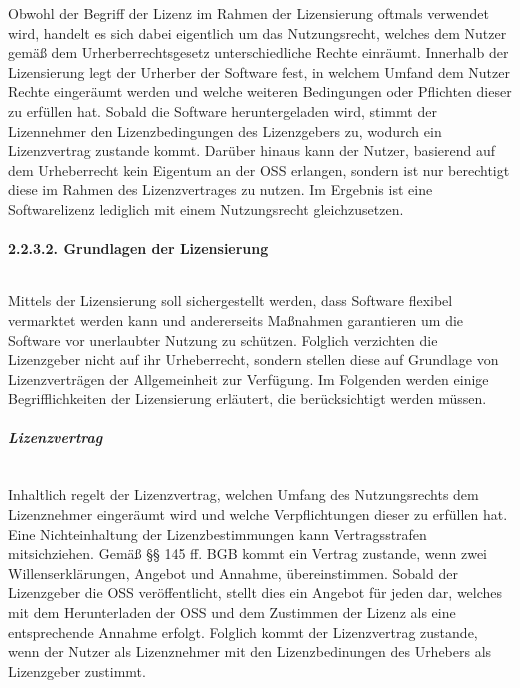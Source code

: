 Obwohl der Begriff der Lizenz im Rahmen der Lizensierung oftmals verwendet wird, handelt es sich dabei eigentlich um das Nutzungsrecht, welches dem Nutzer gemäß dem Urherberrechtsgesetz unterschiedliche Rechte einräumt.\cite[S. 25]{groll_1x1_2021} \cite{wilmer_rechtliche_2021} Innerhalb der Lizensierung legt der Urherber der Software fest, in welchem Umfand dem Nutzer Rechte eingeräumt werden und welche weiteren Bedingungen oder Pflichten dieser zu erfüllen hat. Sobald die Software heruntergeladen wird, stimmt der Lizennehmer den Lizenzbedingungen des Lizenzgebers zu, wodurch ein Lizenzvertrag zustande kommt. \cite{wilmer_rechtliche_2021} Darüber hinaus kann der Nutzer, basierend auf dem Urheberrecht kein Eigentum an der OSS erlangen, sondern ist nur berechtigt diese im Rahmen des Lizenzvertrages zu nutzen. Im Ergebnis ist eine Softwarelizenz lediglich mit einem Nutzungsrecht gleichzusetzen.\cite[S. 29]{kees_open_2015}

\paragraph{2.2.3.2. Grundlagen der Lizensierung}$~$

Mittels der Lizensierung soll sichergestellt werden, dass Software flexibel vermarktet werden kann und andererseits Maßnahmen garantieren um die Software vor unerlaubter Nutzung zu schützen. \cite[S. 29]{schaaf_open-source-lizenzen_2013} Folglich verzichten die Lizenzgeber nicht auf ihr Urheberrecht, sondern stellen diese auf Grundlage von Lizenzverträgen der Allgemeinheit zur Verfügung. Im Folgenden werden einige Begrifflichkeiten der Lizensierung erläutert, die berücksichtigt werden müssen.  

\subparagraph{Lizenzvertrag} $~$

Inhaltlich regelt der Lizenzvertrag, welchen Umfang des Nutzungsrechts dem Lizenznehmer eingeräumt wird und welche Verpflichtungen dieser zu erfüllen hat. \cite[S. 41]{groll_1x1_2021} Eine Nichteinhaltung der Lizenzbestimmungen kann Vertragsstrafen mitsichziehen. Gemäß §§ 145 ff. BGB kommt ein Vertrag zustande, wenn zwei Willenserklärungen, Angebot und Annahme, übereinstimmen. Sobald der Lizenzgeber die OSS veröffentlicht, stellt dies ein Angebot für jeden dar, welches mit dem Herunterladen der OSS und dem Zustimmen der Lizenz als eine entsprechende Annahme erfolgt. \cite[S. 29]{schaaf_open-source-lizenzen_2013} Folglich kommt der Lizenzvertrag zustande, wenn der Nutzer als Lizenznehmer mit den Lizenzbedinungen des Urhebers als Lizenzgeber zustimmt.

